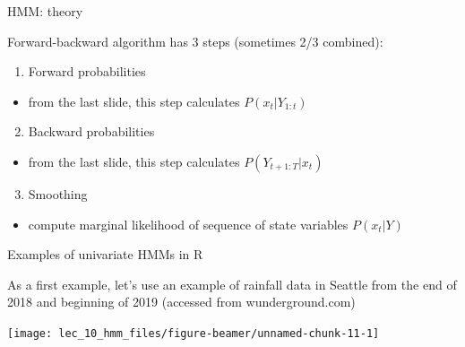 \documentclass[
  ignorenonframetext,
]{beamer}
\providecommand{\tightlist}{%
  \setlength{\itemsep}{0pt}\setlength{\parskip}{0pt}}
\begin{document}
\begin{frame}{HMM: theory}
\protect\hypertarget{hmm-theory-11}{}

Forward-backward algorithm has 3 steps (sometimes 2/3 combined):

\begin{enumerate}
\tightlist
\item
  Forward probabilities
\end{enumerate}

\begin{itemize}
\tightlist
\item
  from the last slide, this step calculates
  \(P({ x }_{ t }|{ Y }_{ 1:t })\)
\end{itemize}

\begin{enumerate}
\setcounter{enumi}{1}
\tightlist
\item
  Backward probabilities
\end{enumerate}

\begin{itemize}
\tightlist
\item
  from the last slide, this step calculates
  \(P({ Y }_{ t+1:T }|{ x }_{ t })\)
\end{itemize}

\begin{enumerate}
\setcounter{enumi}{2}
\tightlist
\item
  Smoothing
\end{enumerate}

\begin{itemize}
\tightlist
\item
  compute marginal likelihood of sequence of state variables
  \(P(x_{t}|Y)\)
\end{itemize}

\end{frame}

\begin{frame}{Examples of univariate HMMs in R}
\protect\hypertarget{examples-of-univariate-hmms-in-r}{}

As a first example, let's use an example of rainfall data in Seattle
from the end of 2018 and beginning of 2019 (accessed from
wunderground.com)

\begin{center}\texttt{[image: lec\_10\_hmm\_files/figure-beamer/unnamed-chunk-11-1]} \end{center}

\end{frame}
\end{document}

